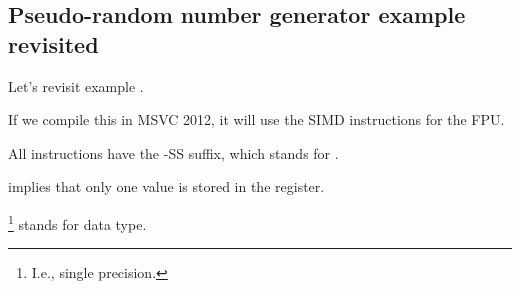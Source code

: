 \subsection{Pseudo-random number generator example revisited}
\label{FPU_PRNG_SIMD}

Let's revisit  example .

If we compile this in MSVC 2012, it will use the SIMD instructions for the FPU.




All instructions have the -SS suffix, which stands for .

 implies that only one value is stored in the register.

\footnote{I.e., single precision.} stands for \Tfloat data type.

